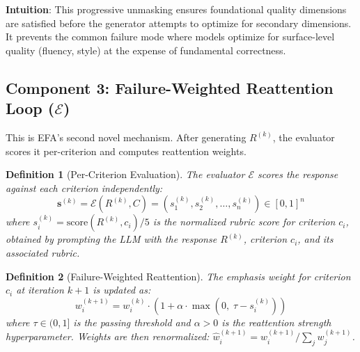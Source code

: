\documentclass[11pt]{article}
\newtheorem{definition}{Definition}
\newcommand{\efa}{\textsc{EFA}}  %
\newcommand{\calE}{\mathcal{E}}
\begin{document}
\textbf{Intuition}: This progressive unmasking ensures foundational quality dimensions are satisfied before the generator attempts to optimize for secondary dimensions. It prevents the common failure mode where models optimize for surface-level quality (fluency, style) at the expense of fundamental correctness.

\subsection{Component 3: Failure-Weighted Reattention Loop ($\calE$)}
\label{sec:fwrl}

This is \efa{}'s second novel mechanism. After generating $R^{(k)}$, the evaluator scores it per-criterion and computes reattention weights.

\begin{definition}[Per-Criterion Evaluation]
The evaluator $\calE$ scores the response against each criterion independently:
\begin{equation}
    \mathbf{s}^{(k)} = \calE(R^{(k)}, C) = \left( s_1^{(k)}, s_2^{(k)}, \ldots, s_n^{(k)} \right) \in [0, 1]^n
\end{equation}
where $s_i^{(k)} = \text{score}(R^{(k)}, c_i) / 5$ is the normalized rubric score for criterion $c_i$, obtained by prompting the LLM with the response $R^{(k)}$, criterion $c_i$, and its associated rubric.
\end{definition}

\begin{definition}[Failure-Weighted Reattention]
The emphasis weight for criterion $c_i$ at iteration $k+1$ is updated as:
\begin{equation}
    w_i^{(k+1)} = w_i^{(k)} \cdot \left(1 + \alpha \cdot \max\left(0, \; \tau - s_i^{(k)}\right)\right)
\label{eq:reattention}
\end{equation}
where $\tau \in (0, 1]$ is the passing threshold and $\alpha > 0$ is the reattention strength hyperparameter. Weights are then renormalized: $\hat{w}_i^{(k+1)} = w_i^{(k+1)} / \sum_j w_j^{(k+1)}$.
\end{definition}
\end{document}

